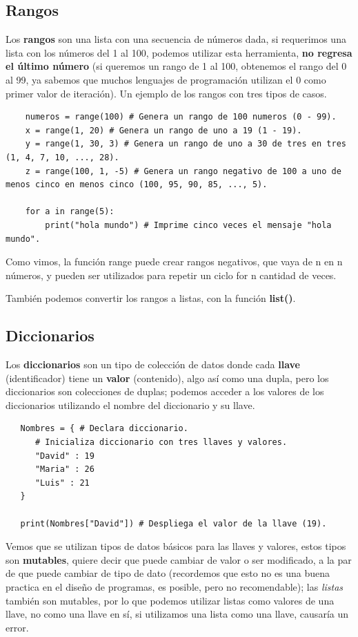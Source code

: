 \subsection{Rangos}
\hspace{0.55cm}Los \textbf{rangos} son una lista con una secuencia de números dada, si requerimos una lista con los números del 1 al 100, podemos utilizar esta herramienta, \textbf{no regresa el último número} (si queremos un rango de 1 al 100, obtenemos el rango del 0 al 99, ya sabemos que muchos lenguajes de programación utilizan el 0 como primer valor de iteración). Un ejemplo de los rangos con tres tipos de casos.
\begin{lstlisting}
	numeros = range(100) # Genera un rango de 100 numeros (0 - 99).
	x = range(1, 20) # Genera un rango de uno a 19 (1 - 19).
	y = range(1, 30, 3) # Genera un rango de uno a 30 de tres en tres (1, 4, 7, 10, ..., 28).
	z = range(100, 1, -5) # Genera un rango negativo de 100 a uno de menos cinco en menos cinco (100, 95, 90, 85, ..., 5).
	
	for a in range(5):
		print("hola mundo") # Imprime cinco veces el mensaje "hola mundo".
\end{lstlisting}

Como vimos, la función range puede crear rangos negativos, que vaya de n en n números, y pueden ser utilizados para repetir un ciclo for n cantidad de veces.

También podemos convertir los rangos a listas, con la función \textbf{list()}.


\subsection{Diccionarios}
\hspace{0.55cm}Los \textbf{diccionarios} son un tipo de colección de datos donde cada \textbf{llave} (identificador) tiene un \textbf{valor} (contenido), algo así como una dupla, pero los diccionarios son colecciones de duplas; podemos acceder a los valores de los diccionarios utilizando el nombre del diccionario y su llave.
\begin{lstlisting}
   Nombres = { # Declara diccionario.
      # Inicializa diccionario con tres llaves y valores.
      "David" : 19
      "Maria" : 26
      "Luis" : 21
   }
   
   print(Nombres["David"]) # Despliega el valor de la llave (19).
\end{lstlisting}

Vemos que se utilizan tipos de datos básicos para las llaves y valores, estos tipos son \textbf{mutables}, quiere decir que puede cambiar de valor o ser modificado, a la par de que puede cambiar de tipo de dato (recordemos que esto no es una buena practica en el diseño de programas, es posible, pero no recomendable); las \textit{listas} también son mutables, por lo que podemos utilizar listas como valores de una llave, no como una llave en sí, si utilizamos una lista como una llave, causaría un error.


